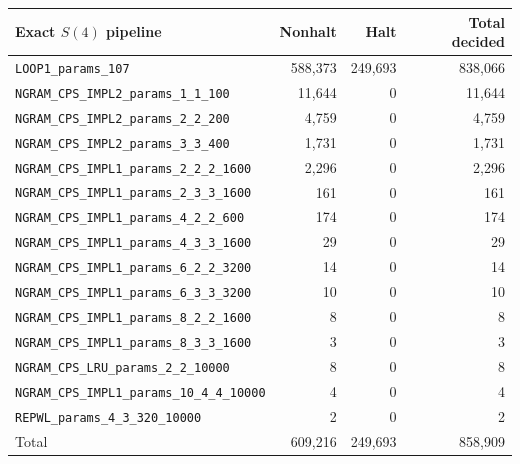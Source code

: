 \documentclass[a4paper,british]{article}
\theoremstyle{definition} %
\numberwithin{equation}{section}
\theoremstyle{definition} %
\begin{document}
\begin{table}[h!]
    \centering
    \begin{tabular}{|lrrr|}
        \hline
        Exact $S(4)$ pipeline                               & Nonhalt   & Halt      & Total decided \\
        \hline
        \texttt{LOOP1\_params\_107}                         & 588{,}373 & 249{,}693 & 838{,}066     \\
        \texttt{NGRAM\_CPS\_IMPL2\_params\_1\_1\_100}       & 11{,}644  & 0         & 11{,}644      \\
        \texttt{NGRAM\_CPS\_IMPL2\_params\_2\_2\_200}       & 4{,}759   & 0         & 4{,}759       \\
        \texttt{NGRAM\_CPS\_IMPL2\_params\_3\_3\_400}       & 1{,}731   & 0         & 1{,}731       \\
        \texttt{NGRAM\_CPS\_IMPL1\_params\_2\_2\_2\_1600}   & 2{,}296   & 0         & 2{,}296       \\
        \texttt{NGRAM\_CPS\_IMPL1\_params\_2\_3\_3\_1600}   & 161       & 0         & 161           \\
        \texttt{NGRAM\_CPS\_IMPL1\_params\_4\_2\_2\_600}    & 174       & 0         & 174           \\
        \texttt{NGRAM\_CPS\_IMPL1\_params\_4\_3\_3\_1600}   & 29        & 0         & 29            \\
        \texttt{NGRAM\_CPS\_IMPL1\_params\_6\_2\_2\_3200}   & 14        & 0         & 14            \\
        \texttt{NGRAM\_CPS\_IMPL1\_params\_6\_3\_3\_3200}   & 10        & 0         & 10            \\
        \texttt{NGRAM\_CPS\_IMPL1\_params\_8\_2\_2\_1600}   & 8         & 0         & 8             \\
        \texttt{NGRAM\_CPS\_IMPL1\_params\_8\_3\_3\_1600}   & 3         & 0         & 3             \\
        \texttt{NGRAM\_CPS\_LRU\_params\_2\_2\_10000}       & 8         & 0         & 8             \\
        \texttt{NGRAM\_CPS\_IMPL1\_params\_10\_4\_4\_10000} & 4         & 0         & 4             \\
        \texttt{REPWL\_params\_4\_3\_320\_10000}            & 2         & 0         & 2             \\
        \hline
        Total                                               & 609{,}216 & 249{,}693 & 858{,}909     \\
        \hline
    \end{tabular}
\end{table}
\end{document}
